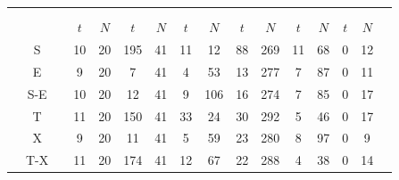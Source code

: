 \documentclass[12pt,bibliography=oldstyle,DIV=12,parskip=half-]{scrreprt}
\begin{document}
%
\begin{table}[h]
  \newcommand{\ti}[1]{\scriptsize #1}
  \footnotesize\center\sffamily
  \setlength{\tabcolsep}{5.1pt}
  \begin{tabular}{@{}ccc@{}SSSSSSSSSSSSS@{}}
    \toprule
    &&&  &  &  
    \\
    \cmidrule(lr){4-5}\cmidrule(lr){6-9}\cmidrule(lr){10-15}
    &&&  &
    &
    & &
    &
    \\
    \cmidrule(lr){4-5}\cmidrule(lr){6-7}\cmidrule(lr){8-9}
    \cmidrule(lr){10-11}\cmidrule(lr){12-13}\cmidrule(lr){14-15}
    &&& $t$ & $N$ &$t$ & $N$ &$t$ & $N$ &$t$ & $N$ &$t$ & $N$ &$t$ & $N$ 
    \\
    \midrule
&{S}  &&    10 & 20&   195 &    41 &    11 &    12 &    88 &   269 &    11 &    68 &     0 &    12 \\
&{E}  &&     9 & 20&    7 &    41 &     4 &    53 &    13 &   277 &     7 &    87 &     0 &    11 \\
&{S-E}&&    10 & 20&   12 &    41 &     9 &   106 &    16 &   274 &     7 &    85 &     0 &    17 \\
&{T}  &&    11 & 20&  150 &    41 &    33 &    24 &    30 &   292 &     5 &    46 &     0 &    17 \\
&{X}  &&     9 & 20&   11 &    41 &     5 &    59 &    23 &   280 &     8 &    97 &     0 &     9 \\
&{T-X}&&    11 & 20&  174 &    41 &    12 &    67 &    22 &   288 &     4 &    38 &     0 &    14 \\

\end{tabular}
\end{table}
\end{document}
